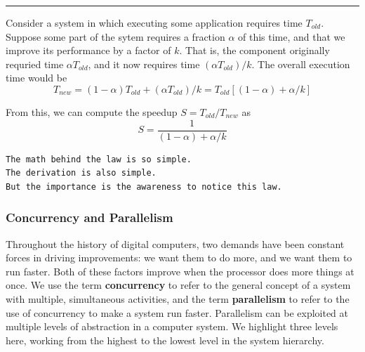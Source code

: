 \documentclass[11pt]{article}
\begin{document}
\noindent\rule{\textwidth}{0.5pt}
Consider a system in which executing some application requires time \(T_{old}\). Suppose some part of the sytem requires a fraction \(\alpha\) of this time, and that we improve its performance by a factor of \(k\). That is, the component originally requried time \(\alpha T_{old}\), and it now requires time \((\alpha T_{old})/k\). The overall execution time would be\\
\begin{equation}
T_{new} = (1-\alpha)T_{old} + (\alpha T_{old})/k = T_{old}[(1-\alpha) + \alpha/k]
\end{equation}

From this, we can compute the speedup \(S = T_{old}/T_{new}\) as\\
\begin{equation}
S = \frac{1}{(1-\alpha) + \alpha/k}
\end{equation}

\begin{verbatim}
The math behind the law is so simple.
The derivation is also simple.
But the importance is the awareness to notice this law.
\end{verbatim}

\subsubsection{Concurrency and Parallelism}
\label{sec:orgc3768aa}
Throughout the history of digital computers, two demands have been constant forces in driving improvements: we want them to do more, and we want them to run faster. Both of these factors improve when the processor does more things at once. We use the term \textbf{concurrency} to refer to the general concept of a system with multiple, simultaneous activities, and the term \textbf{parallelism} to refer to the use of concurrency to make a system run faster. Parallelism can be exploited at multiple levels of abstraction in a computer system. We highlight three levels here, working from the highest to the lowest level in the system hierarchy.\\
\end{document}
